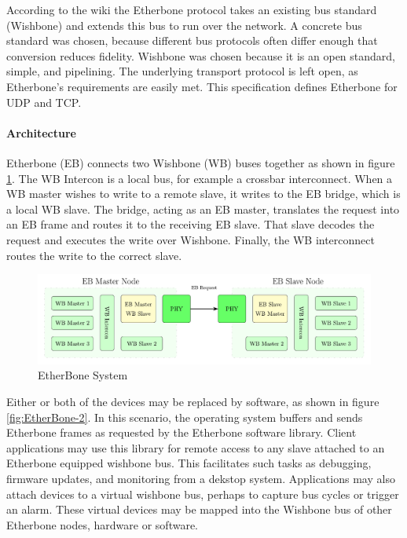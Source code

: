 \vspace{5 mm}

\noindent According to the wiki \cite{etherbone-core:wiki} the Etherbone protocol takes an existing bus standard (Wishbone) and extends this bus to run over the network. 
A concrete bus standard was chosen, because different bus protocols often differ enough that conversion reduces fidelity. 
Wishbone was chosen because it is an open standard, simple, and pipelining. 
The underlying transport protocol is left open, as Etherbone's requirements are easily met. 
This specification defines Etherbone for UDP and TCP.

\paragraph{Architecture}

Etherbone (EB) connects two Wishbone (WB) buses together as shown in figure \ref{fig:EtherBone-1}. 
The WB Intercon is a local bus, for example a crossbar interconnect. 
When a WB master wishes to write to a remote slave, it writes to the EB bridge, which is a local WB slave. 
The bridge, acting as an EB master, translates the request into an EB frame and routes it to the receiving EB slave. 
That slave decodes the request and executes the write over Wishbone. 
Finally, the WB interconnect routes the write to the correct slave.

\begin{figure}[H]
    \centering
    \includegraphics[width=15cm]{figures/EtherBone_1.pdf}
    \caption{EtherBone System}
    \label{fig:EtherBone-1}
\end{figure}

\vspace{5 mm}

\noindent Either or both of the devices may be replaced by software, as shown in figure \ref{fig:EtherBone-2}. 
In this scenario, the operating system buffers and sends Etherbone frames as requested by the Etherbone software library.
Client applications may use this library for remote access to any slave attached to an Etherbone equipped wishbone bus. 
This facilitates such tasks as debugging, firmware updates, and monitoring from a dekstop system. 
Applications may also attach devices to a virtual wishbone bus, perhaps to capture bus cycles or trigger an alarm. 
These virtual devices may be mapped into the Wishbone bus of other Etherbone nodes, hardware or software.

